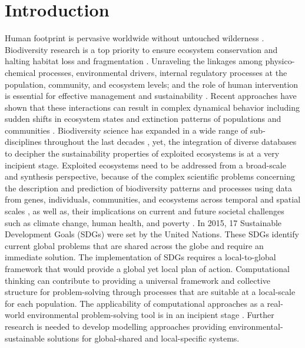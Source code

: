 \documentclass[12pt,a4paper]{article}
\begin{document}
\newpage

\section{Introduction}

Human footprint is pervasive worldwide without untouched wilderness \citep{marconcini2020outlining, mcdowell2020pervasive}. Biodiversity research is a top priority to ensure ecosystem conservation and halting habitat loss and fragmentation \citep{brum2017global}. Unraveling the linkages among physico-chemical processes, environmental drivers, internal regulatory processes at the population, community, and ecosystem levels; and the role of human intervention is essential for effective management and sustainability \citep{hobbs2011intervention}. Recent approaches have shown that these interactions can result in complex dynamical behavior including sudden shifts in ecosystem states and extinction patterns of populations and communities \citep{newman2019scaling}. Biodiversity science has expanded in a wide range of sub-disciplines throughout the last decades \citep{loreau2010challenges}, yet, the integration of diverse databases to decipher the sustainability properties of exploited ecosystems is at a very incipient stage. Exploited ecosystems need to be addressed from a broad-scale and synthesis perspective, because of the complex scientific problems concerning the description and prediction of biodiversity patterns and processes using data from genes, individuals, communities, and ecosystems across temporal and spatial scales \citep{chase2018embracing}, as well as, their implications on current and future societal challenges such as climate change, human health, and poverty \citep{cardinale2012biodiversity, turner2012global}. In 2015, 17 Sustainable Development Goals (SDGs) were set by the United Nations. These SDGs identify current global problems that are shared across the globe and require an immediate solution.  The  implementation  of  SDGs requires a local-to-global framework that would provide a global yet local plan of action. Computational thinking can  contribute  to providing a universal framework and collective structure for problem-solving through processes that are suitable at a local-scale for each population. The applicability of computational approaches as a real-world environmental problem-solving tool is in an incipient stage \citep{rabiee2017abstraction}. Further research is needed to develop modelling approaches providing environmental-sustainable solutions for global-shared and local-specific systems.
\end{document}
